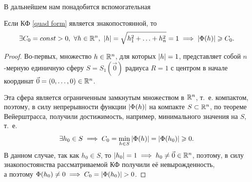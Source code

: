 \documentclass[../../main.tex]{subfiles}
\begin{document}
	В дальнейшем нам понадобится вспомогательная
	\begin{lem}
		Если КФ \eqref{quad form} является знакопостоянной, то
		\begin{equation}
		\label{eval form}
			\exists C_0 = const > 0,\ 
			\forall h \in \R^n,\ \abs{h} = \sqrt{h_1^2 + \ldots + h_n^2} = 1
			\implies \abs{\Phi(h)} \ge C_0.
		\end{equation}
	\end{lem}
	\begin{proof}
		Во-первых, множество $h \in \mathbb{R}^n$, для которых $\left|{h}\right| = 1$,
		представляет собой $n$-мерную единичную сферу $S = S_1(\vec{0})$
		радиуса $R = 1$ с центром в начале координат
		$\vec{0} = (0, \ldots, 0) \in \mathbb{R}^n$.
		
		Эта сфера является ограниченным замкнутым множеством в $\mathbb{R}^n$, т.~е.
		компактом, поэтому, в силу непрерывности функции $\left|{\Phi(h)}\right|$
		на компакте $S \subset \mathbb{R}^n$, по теореме Вейерштрасса, получили
		достижимость, например, минимального значения на $S$, т.~е.
		\[
			\exists h_0 \in S \implies
			C_0 = \min_{h \in S} \left|{\Phi(h)}\right|
			= \left|{\Phi(h_0)}\right| \geqslant 0.
		\]
		В данном случае, так как $h_0 \in S$, то
		$\left|{h_0}\right| = 1 \implies h_0 \ne \vec{0} \in \mathbb{R}^n$,
		поэтому, в силу знакопостоянства рассматриваемой КФ
		получили её невырожденность, \\
		а поэтому $\Phi(h_0) \ne 0 \implies C_0 = \left|{\Phi(h_0)}\right| > 0$.
	\end{proof}
\end{document}
